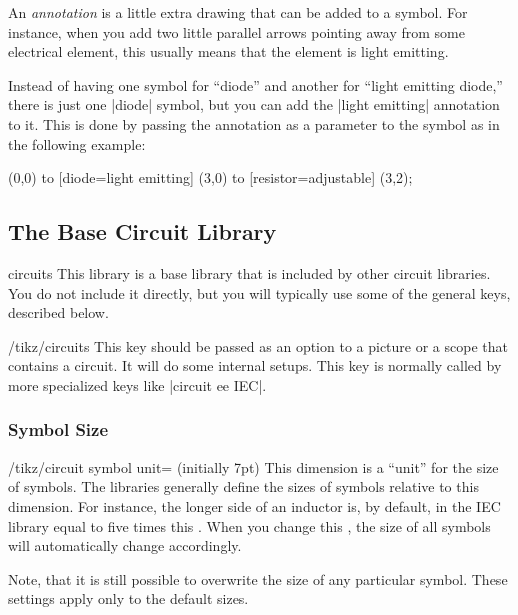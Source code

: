 An \emph{annotation} is a little extra drawing that can be added to a
symbol. For instance, when you add two little parallel arrows pointing
away from some electrical element, this usually means that the element
is light emitting.

Instead of having one symbol for ``diode'' and another for ``light
emitting diode,'' there is just one |diode| symbol, but you can add
the |light emitting| annotation to it. This is done by passing the
annotation as a parameter to the symbol as in the following example:

\begin{codeexample}[]
  \draw (0,0) to [diode={light emitting}] (3,0)
              to [resistor={adjustable}]  (3,2);
\end{codeexample}



\subsection{The Base Circuit Library}

\begin{tikzlibrary}{circuits}
  This library is a base library that is included by other circuit
  libraries. You do not include it directly, but you will typically
  use some of the general keys, described below.
\end{tikzlibrary}

\begin{key}{/tikz/circuits}
  This key should be passed as an option to a picture or a scope that
  contains a circuit. It will do some internal setups. This key is
  normally called by more specialized keys like |circuit ee IEC|.
\end{key}




\subsubsection{Symbol Size}

\begin{key}{/tikz/circuit symbol unit= (initially 7pt)}
  This dimension is a ``unit'' for the size of symbols. The libraries
  generally define the sizes of symbols relative to this
  dimension. For instance, the longer side of an inductor is, by
  default, in the IEC library equal to five times this
  . When you change this , the size of
  all symbols will automatically change accordingly.

  Note, that it is still possible to overwrite the size of any
  particular symbol. These settings apply only to the default sizes.

\begin{codeexample}[]
\end{codeexample}
\end{key}

